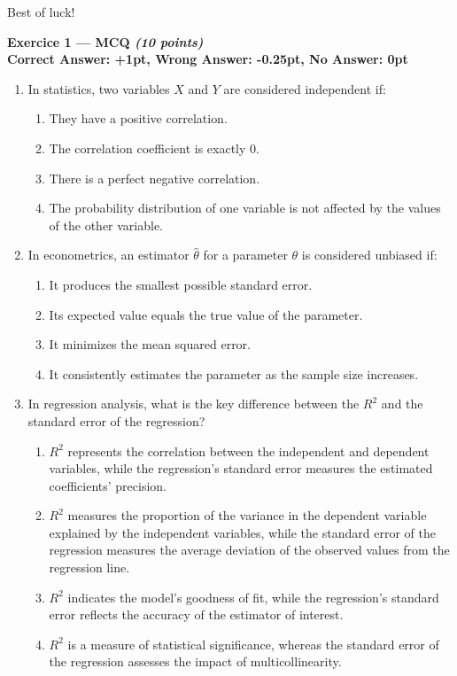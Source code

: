 \documentclass{article}
\begin{document}
\vspace{1cm}

Best of luck!

\newpage

\textbf{Exercice 1 --- MCQ \textit{(10 points)}}\\[1em]
\textbf{Correct Answer: +1pt, Wrong Answer: -0.25pt, No Answer: 0pt}\\[1em]


\begin{enumerate}[label=\textbf{\arabic*.}]

    \item In statistics, two variables \(X\) and \(Y\) are considered independent if:
    \begin{enumerate}[label=\Alph*)]
        \item They have a positive correlation.
        \item The correlation coefficient is exactly 0.
        \item There is a perfect negative correlation.
        \item The probability distribution of one variable is not affected by the values of the other variable.
    \end{enumerate}

    \item In econometrics, an estimator \(\hat{\theta}\) for a parameter \(\theta\) is considered unbiased if:
    \begin{enumerate}[label=\Alph*)]
        \item It produces the smallest possible standard error.
        \item Its expected value equals the true value of the parameter.
        \item It minimizes the mean squared error.
        \item It consistently estimates the parameter as the sample size increases.
    \end{enumerate}

    \item In regression analysis, what is the key difference between the \(R^2\) and the standard error of the regression?
    \begin{enumerate}[label=\Alph*)]
        \item \(R^2\) represents the correlation between the independent and dependent variables, while the regression's standard error measures the estimated coefficients' precision.
        \item \(R^2\) measures the proportion of the variance in the dependent variable explained by the independent variables, while the standard error of the regression measures the average deviation of the observed values from the regression line.
        \item \(R^2\) indicates the model's goodness of fit, while the regression's standard error reflects the accuracy of the estimator of interest.
        \item[D.] \(R^2\) is a measure of statistical significance, whereas the standard error of the regression assesses the impact of multicollinearity.
    \end{enumerate}


\end{enumerate}
\end{document}

